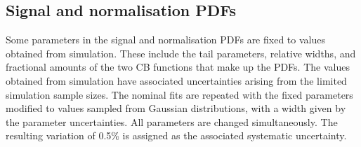 


\subsection{Signal and normalisation PDFs}

Some parameters in the signal and normalisation PDFs are fixed to values obtained from simulation. These include the tail parameters, relative widths, and fractional amounts of the two CB functions that make up the PDFs. The values obtained from simulation have associated uncertainties arising from the limited simulation sample sizes. The nominal fits are repeated with the fixed parameters modified to values sampled from Gaussian distributions, with a width given by the parameter uncertainties. All parameters are changed simultaneously. The resulting variation of 0.5\% is assigned as the associated systematic uncertainty. 


